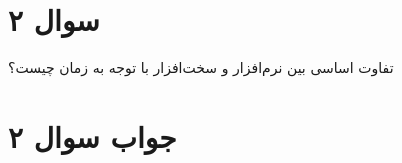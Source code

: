 \section*{سوال ۲}

تفاوت اساسی بین نرم‌افزار و سخت‌افزار با توجه به زمان چیست؟

\section*{جواب سوال ۲}

